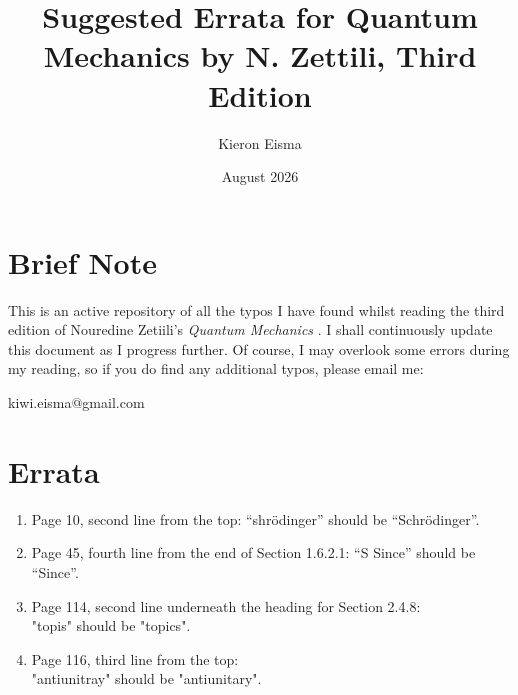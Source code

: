 \documentclass{article}
\title{Suggested Errata for Quantum Mechanics by N. Zettili, Third Edition}
\author{Kieron Eisma}
\date{August 2026}
\begin{document}
\maketitle

\section*{Brief Note}

This is an active repository of all the typos I have found whilst reading the third edition of Nouredine Zetiili's \textit{Quantum Mechanics} \cite{Zettili}. I shall continuously update this document as I progress further. Of course, I may overlook some errors during my reading, so if you do find any additional typos, please email me:

kiwi.eisma@gmail.com

\section*{Errata}

\begin{enumerate}
    
\item Page 10, second line from the top:  
“shrödinger” should be “Schrödinger”.

\item Page 45, fourth line from the end of Section 1.6.2.1: 
“S Since” should be “Since”.

\item Page 114, second line underneath the heading for Section 2.4.8:\\
    "topis" should be "topics".
    
\item Page 116, third line from the top:\\
    "antiunitray" should be "antiunitary".
\end{enumerate}



\printbibliography[
heading=bibintoc,
title={References}
]
\end{document}
